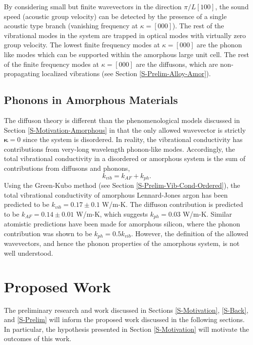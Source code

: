 \documentclass[letterpaper,12pt]{article}
\begin{document}
By considering small but finite wavevectors in the direction $\pi/L[1 0 0]$, the sound speed (acoustic group velocity) can be detected by the presence of a single acoustic type branch (vanishing frequency at $\kappa=[0 0 0]$). The rest of the vibrational modes in the system are trapped in optical modes with virtually zero group velocity. The lowest finite frequency modes at $\kappa=[0 0 0]$ are the phonon like modes which can be supported within the amorphous large unit cell.\cite{allen1993,PhysRevE.81.021301} The rest of the finite frequency modes at $\kappa=[0 0 0]$ are the diffusons, which are non-propagating localized vibrations (see Section \ref{S-Prelim-Alloy-Amor}). 
\subsection{\label{S-Prelim-Phonons-Amor} Phonons in Amorphous Materials }
The diffuson theory is different than the phenomenological models discussed in Section \ref{S-Motivation-Amorphous} in that the only allowed wavevector is strictly $\mathbf{\kappa}= 0$ since the system is disordered. In reality, the vibrational conductivity has contributions from very-long wavelength phonon-like modes. Accordingly, the total vibrational conductivity in a disordered or amorphous system is the sum of contributions from diffusons and phonons,
\begin{equation}\label{EQ:M:k_thermal}
k_{vib} = k_{AF} + k_{ph}.
\end{equation}
Using the Green-Kubo method (see Section \ref{S-Prelim-Vib-Cond-Ordered}), the total vibrational conductivity of amorphous Lennard-Jones argon has been predicted to be $k_{vib}=0.17 \pm 0.1$ W/m-K. The diffuson contribution is predicted to be $k_{AF} = 0.14 \pm 0.01$ W/m-K, which suggests $k_{ph} = 0.03$ W/m-K. Similar atomistic predictions have been made for amorphous silicon, where the phonon contribution was shown to be $k_{ph} = 0.5k_{vib}$.\cite{He2011a} However, the definition of the allowed wavevectors, and hence the phonon properties of the amorphous system, is not well understood.\cite{He2011a}
\clearpage
\section{\label{S-Propsed-Work}Proposed Work}
The preliminary research and work discussed in Sections \ref{S-Motivation}, \ref{S-Back}, and \ref{S-Prelim} will inform the proposed work discussed in the following sections. In particular, the hypothesis presented in Section \ref{S-Motivation} will motivate the outcomes of this work.
\end{document}
